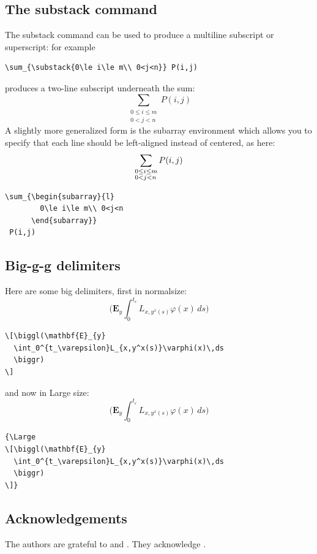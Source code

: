 \documentclass[manuscript, printscheme]{aomart}
\newcommand{\ntt}{\normalfont\ttfamily}
\newcommand{\cn}[1]{{\protect\ntt\bslash#1}}
\newcommand{\env}[1]{{\protect\ntt#1}}
\newtheorem[{}\it]{thm}{Theorem}[section]
\theoremstyle{definition}
\newtheorem*[{}\it]{notation}{Notation}
\begin{document}
\subsection{The \cn{substack} command}

The \cn{substack} command can be used to produce a multiline
subscript or superscript:
for example
\begin{verbatim}
\sum_{\substack{0\le i\le m\\ 0<j<n}} P(i,j)
\end{verbatim}
produces a two-line subscript underneath the sum:
\begin{equation}
\sum_{\substack{0\le i\le m\\ 0<j<n}} P(i,j)
\end{equation}
A slightly more generalized form is the \env{subarray} environment which
allows you to specify that each line should be left-aligned instead of
centered, as here:
\begin{equation}
\sum_{\begin{subarray}{l}
        0\le i\le m\\ 0<j<n
      \end{subarray}}
 P(i,j)
\end{equation}
\begin{verbatim}
\sum_{\begin{subarray}{l}
        0\le i\le m\\ 0<j<n
      \end{subarray}}
 P(i,j)
\end{verbatim}


\subsection{Big-g-g delimiters}

Here are some big delimiters, first in \cn{normalsize}:
\[\biggl(\mathbf{E}_{y}
  \int_0^{t_\varepsilon}L_{x,y^x(s)}\varphi(x)\,ds
  \biggr)
\]
\begin{verbatim}
\[\biggl(\mathbf{E}_{y}
  \int_0^{t_\varepsilon}L_{x,y^x(s)}\varphi(x)\,ds
  \biggr)
\]
\end{verbatim}
and now in \cn{Large} size:
{\Large
\[\biggl(\mathbf{E}_{y}
  \int_0^{t_\varepsilon}L_{x,y^x(s)}\varphi(x)\,ds
  \biggr)
\]}
\begin{verbatim}
{\Large
\[\biggl(\mathbf{E}_{y}
  \int_0^{t_\varepsilon}L_{x,y^x(s)}\varphi(x)\,ds
  \biggr)
\]}
\end{verbatim}

\subsection{Acknowledgements}
\label{sec:acks}

The authors are grateful to  and
.  They acknowledge .




\end{document}
